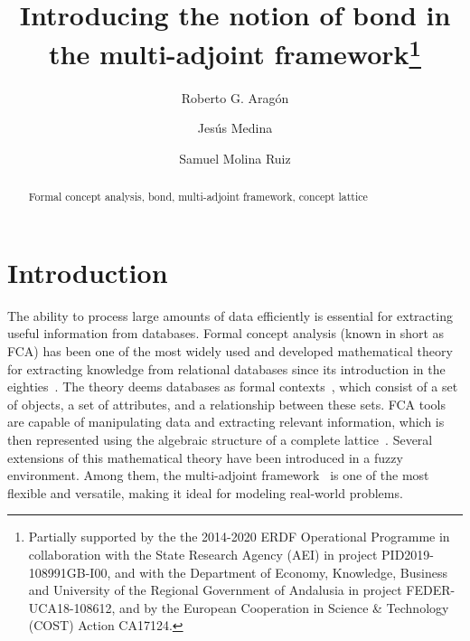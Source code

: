 \documentclass[runningheads,a4paper]{llncs}
\newcommand{\keywords}[1]{\par\addvspace\baselineskip
\noindent\keywordname\enspace\ignorespaces#1}
\newcommand{\cred}[1]{{\color{red} #1}}
\begin{document}
	
\mainmatter  %

%
\title{\cred{Introducing the notion of bond in the multi-adjoint framework}\thanks{Partially supported by the the 2014-2020 ERDF Operational Programme in collaboration with the State Research Agency (AEI) in project PID2019-108991GB-I00, and with the Department of Economy, Knowledge, Business and University of the Regional Government of Andalusia in project FEDER-UCA18-108612, and by the European Cooperation in Science \& Technology (COST) Action CA17124.}}
%
\titlerunning{}
%
\author{Roberto G. Aragón%
\and
Jesús Medina%
\and
Samuel Molina Ruiz%
}
%
%
%
\maketitle              %
% 
\begin{abstract}

	
\keywords{Formal concept analysis, bond, multi-adjoint framework, concept lattice}
\end{abstract}

\section{Introduction}

The ability to process large amounts of data efficiently is essential for extracting useful information from databases. Formal concept analysis (known in short as FCA) has been one of the most widely used and developed mathematical theory for extracting knowledge from relational databases since its introduction in the eighties~\cite{Wille:1982}. The theory deems databases as formal contexts~\cite{GanterW}, which consist of a set of objects, a set of attributes, and a relationship between these sets. FCA tools are capable of manipulating data and extracting relevant information, which is then represented using the algebraic structure of a complete lattice~\cite{?}.  Several extensions of this mathematical theory have been introduced in a fuzzy environment. Among them, the multi-adjoint framework~\cite{TFS:2020-acmr,ar:ins:2015,ins2018:cmr,mor-fss-cmpi} is one of the most flexible and versatile, making it ideal for modeling real-world problems.
\end{document}
